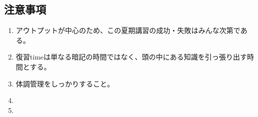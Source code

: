   \subsection{\textbf{注意事項}}
      \begin{enumerate}
      \item アウトプットが中心のため、この夏期講習の成功・失敗はみんな次第である。
      \item 復習timeは単なる暗記の時間ではなく、頭の中にある知識を引っ張り出す時間とする。
      \item 体調管理をしっかりすること。
      \item {}
      \item {}
    \end{enumerate}
    \vspace{1em}
  \newpage
